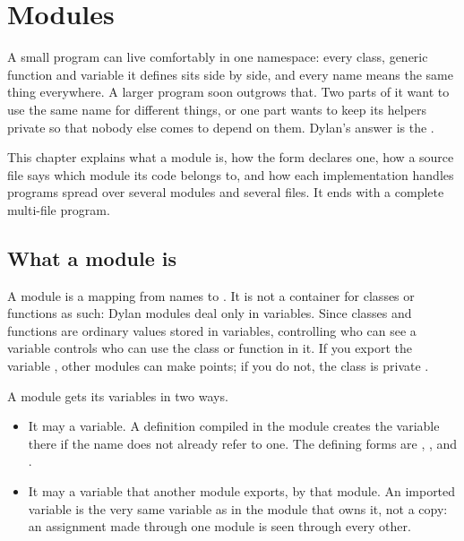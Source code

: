 \chapter{Modules}\label{ch:modules}

A small program can live comfortably in one namespace: every class,
generic function and variable it defines sits side by side, and every
name means the same thing everywhere. A larger program soon outgrows
that. Two parts of it want to use the same name for different things, or
one part wants to keep its helpers private so that nobody else comes to
depend on them. Dylan's answer is the .

This chapter explains what a module is, how the  form
declares one, how a source file says which module its code belongs to,
and how each implementation handles programs spread over several modules
and several files. It ends with a complete multi-file program.

\section{What a module is}\label{sec:modules-what}

A module is a mapping from names to . It is not a
container for classes or functions as such: Dylan modules deal only in
variables. Since classes and functions are ordinary values stored in
variables, controlling who can see a variable controls who can use the
class or function in it. If you export the variable , other
modules can make points; if you do not, the class is private
.

A module gets its variables in two ways.

\begin{itemize}
\item It may  a variable. A definition compiled in the
  module creates the variable there if the name does not already refer
  to one. The defining forms are , ,
   and .
\item It may  a variable that another module exports, by
   that module. An imported variable is the very same
  variable as in the module that owns it, not a copy: an assignment made
  through one module is seen through every other.
\end{itemize}

